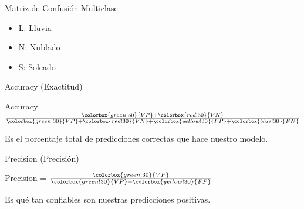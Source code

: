 \documentclass{beamer}
\begin{document}
\begin{frame}{Matriz de Confusión Multiclase}
    \begin{center}
    \end{center}
    
    \begin{itemize}
        \item L: Lluvia
        \item N: Nublado
        \item S: Soleado
    \end{itemize}
\end{frame}

\begin{frame}{Accuracy (Exactitud)}
    \begin{center}
    \Large Accuracy = $\frac{\colorbox{green!30}{VP} + \colorbox{red!30}{VN}}{\colorbox{green!30}{VP} + \colorbox{red!30}{VN} + \colorbox{yellow!30}{FP} + \colorbox{blue!30}{FN}}$
    \end{center}
    Es el porcentaje total de predicciones correctas que hace nuestro modelo.
\end{frame}

\begin{frame}{Precision (Precisión)}
    \begin{center}
    \Large Precision = $\frac{\colorbox{green!30}{VP}}{\colorbox{green!30}{VP} + \colorbox{yellow!30}{FP}}$
    \end{center}
    Es qué tan confiables son nuestras predicciones positivas.
\end{frame}
\end{document}

